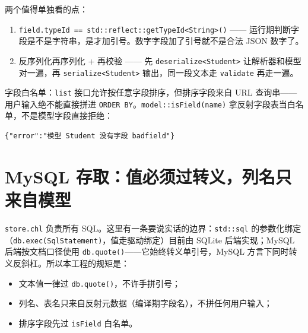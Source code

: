 两个值得单独看的点：

\begin{enumerate}

\item \texttt{field.\allowbreak{}type\allowbreak{}Id =\allowbreak{}=\allowbreak{} std:\allowbreak{}:\allowbreak{}reflect:\allowbreak{}:\allowbreak{}get\allowbreak{}Type\allowbreak{}Id<\allowbreak{}String>\allowbreak{}(\allowbreak{})\allowbreak{}} —— 运行期判断字段是不是字符串，是才加引号。数字字段加了引号就不是合法 JSON 数字了。

\item 反序列化再序列化 + 再校验 —— 先 \texttt{deserialize<\allowbreak{}Student>\allowbreak{}} 让解析器和模型对一遍，再 \texttt{serialize<\allowbreak{}Student>\allowbreak{}} 输出，同一段文本走 \texttt{validate} 再走一遍。

\end{enumerate}

字段白名单：\texttt{list} 接口允许按任意字段排序，但排序字段来自 URL 查询串——用户输入绝不能直接拼进 \texttt{ORDER BY}。\texttt{model:\allowbreak{}:\allowbreak{}is\allowbreak{}Field(\allowbreak{}name)\allowbreak{}} 拿反射字段表当白名单，不是模型字段直接拒绝：

\par
\medskip
\begin{lstlisting}[style=out]
{"error":"模型 Student 没有字段 badfield"}
\end{lstlisting}
\par
\medskip

\section{MySQL 存取：值必须过转义，列名只来自模型}

\texttt{store.\allowbreak{}chl} 负责所有 SQL。这里有一条要说实话的边界：\texttt{std:\allowbreak{}:\allowbreak{}sql} 的参数化绑定（\texttt{db.\allowbreak{}exec(\allowbreak{}Sql\allowbreak{}Statement)\allowbreak{}}，值走驱动绑定）目前由 SQLite 后端实现；MySQL 后端按文档口径使用 \texttt{db.\allowbreak{}quote(\allowbreak{})\allowbreak{}}——它始终转义单引号，MySQL 方言下同时转义反斜杠。所以本工程的规矩是：

\begin{itemize}

\item 文本值一律过 \texttt{db.\allowbreak{}quote(\allowbreak{})\allowbreak{}}，不许手拼引号；

\item 列名、表名只来自反射元数据（编译期字段名），不拼任何用户输入；

\item 排序字段先过 \texttt{is\allowbreak{}Field} 白名单。

\end{itemize}

